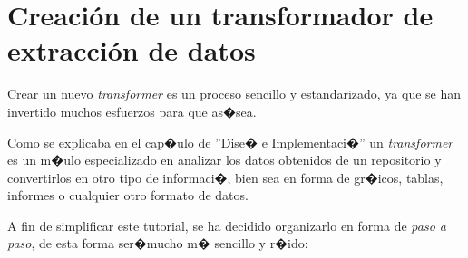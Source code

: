 \documentclass[a4paper,10pt]{book}
\begin{document}
\chapter{Creaci\'on de un transformador de extracci\'on de datos}
\label{cap:transformer}

Crear un nuevo \textit{transformer} es un proceso sencillo y estandarizado, ya que
se han invertido muchos esfuerzos para que as�sea.

Como se explicaba en el cap�ulo de ''Dise� e Implementaci�'' un \textit{transformer}
es un m�ulo especializado en analizar los datos obtenidos de un repositorio y
convertirlos en otro tipo de informaci�, bien sea en forma de gr�icos, tablas,
informes o cualquier otro formato de datos.

A fin de simplificar este tutorial, se ha decidido organizarlo en forma de \textit{paso a paso},
de esta forma ser�mucho m� sencillo y r�ido:
\end{document}
